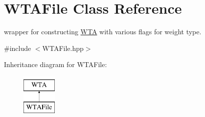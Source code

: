 \hypertarget{classWTAFile}{}\section{W\+T\+A\+File Class Reference}
\label{classWTAFile}


wrapper for constructing \mbox{\hyperlink{classWTA}{W\+TA}} with various flags for weight type.  




{\ttfamily \#include $<$W\+T\+A\+File.\+hpp$>$}

Inheritance diagram for W\+T\+A\+File\+:\begin{figure}[H]
\begin{center}
\leavevmode
\includegraphics[height=2.000000cm]{classWTAFile}
\end{center}
\end{figure}
